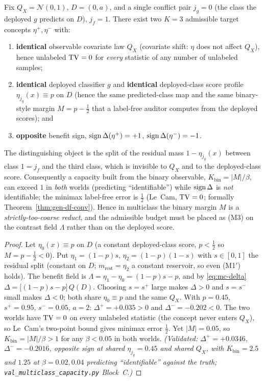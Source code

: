 \begin{theorem}
\label{thm:mc-thirdclass}
Fix $Q_X=\mathcal N(0,1)$, $D=(0,a)$, and a single conflict pair $j_g=0$ (the class the
deployed $g$ predicts on $D$), $j_f=1$. There exist two $K=3$ admissible target concepts
$\eta^+,\eta^-$ with:
\begin{enumerate}\itemsep1pt
\item[\textnormal{(i)}] \textbf{identical} observable covariate law $Q_X$ (covariate shift:
$\eta$ does not affect $Q_X$), hence unlabeled $\mathrm{TV}=0$ for \emph{every} statistic of any
number of unlabeled samples;
\item[\textnormal{(ii)}] \textbf{identical} deployed classifier $g$ and \textbf{identical}
deployed-class score profile $\eta_{j_g}(x)\equiv p$ on $D$ (hence the same predicted-class
map and the same binary-style margin $M=p-\tfrac12$ that a label-free auditor computes from
the deployed scores); and
\item[\textnormal{(iii)}] \textbf{opposite} benefit sign,
$\operatorname{sign}\Delta(\eta^+)=+1$, $\operatorname{sign}\Delta(\eta^-)=-1$.
\end{enumerate}
The distinguishing object is the split of the residual mass $1-\eta_{j_g}(x)$ between class
$1=j_f$ and the third class, which is invisible to $Q_X$ and to the deployed-class score.
Consequently a capacity built from the binary observable, $K_{\mathrm{bin}}=|M|/\beta$, can
exceed $1$ in \emph{both} worlds (predicting ``identifiable'') while $\operatorname{sign}\Delta$ is
\emph{not} identifiable; the minimax label-free error is $\tfrac12$ (Le~Cam, $\mathrm{TV}=0$;
formally Theorem~\ref{thm:gen-df-conv}). Hence in multiclass the binary margin $M$ is a
\emph{strictly-too-coarse reduct}, and the admissible budget must be placed as
\textnormal{(M3)} on the contrast field $\Lambda$ rather than on the deployed score.
\end{theorem}
\begin{proof}
Let $\eta_0(x)\equiv p$ on $D$ (a constant deployed-class score, $p<\tfrac12$ so
$M=p-\tfrac12<0$). Put $\eta_1=(1-p)s$, $\eta_2=(1-p)(1-s)$ with $s\in[0,1]$ the residual
split (constant on $D$; $m_{\mathrm{rest}}=\eta_2$ a constant reservoir, so even (M1$'$)
holds). The benefit field is $\Lambda=\eta_1-\eta_0=(1-p)s-p$, and by \eqref{eq:mc-delta}
$\Delta=\big[(1-p)s-p\big]\,Q(D)$. Choosing $s=s^+$ large makes $\Delta>0$ and $s=s^-$
small makes $\Delta<0$; both share $\eta_0\equiv p$ and the same $Q_X$. With $p=0.45$,
$s^+=0.95$, $s^-=0.05$, $a=2$: $\Delta^+=+0.035>0$ and $\Delta^-=-0.202<0$. The two worlds
have $\mathrm{TV}=0$ on every unlabeled statistic (the concept never enters $Q_X$), so Le~Cam's
two-point bound gives minimax error $\tfrac12$. Yet $|M|=0.05$, so
$K_{\mathrm{bin}}=|M|/\beta>1$ for any $\beta<0.05$ in both worlds.
\emph{(Validated: $\Delta^+=+0.0346$, $\Delta^-=-0.2016$, opposite sign at shared
$\eta_{j_g}=0.45$ and shared $Q_X$, with $K_{\mathrm{bin}}=2.5$ and $1.25$ at
$\beta=0.02,0.04$ predicting ``identifiable'' against the truth;
\texttt{val\_multiclass\_capacity.py} Block~C.)}
\end{proof}


